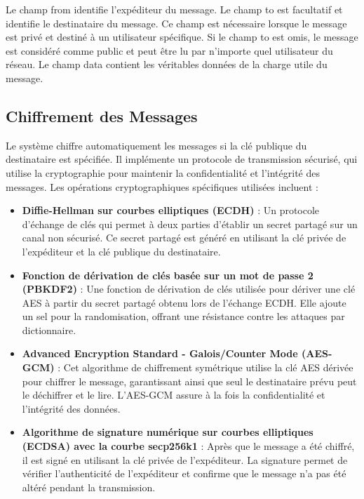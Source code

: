 Le champ from identifie l'expéditeur du message.
Le champ to est facultatif et identifie le destinataire du message. Ce champ est nécessaire lorsque le message est privé et destiné à un utilisateur spécifique. Si le champ to est omis, le message est considéré comme public et peut être lu par n'importe quel utilisateur du réseau.
Le champ data contient les véritables données de la charge utile du message.

\subsection{Chiffrement des Messages}

Le système chiffre automatiquement les messages si la clé publique du destinataire est spécifiée. Il implémente un protocole de transmission sécurisé, qui utilise la cryptographie pour maintenir la confidentialité et l'intégrité des messages. Les opérations cryptographiques spécifiques utilisées incluent :

\begin{itemize}
\item \textbf{Diffie-Hellman sur courbes elliptiques (ECDH)} : Un protocole d'échange de clés qui permet à deux parties d'établir un secret partagé sur un canal non sécurisé. Ce secret partagé est généré en utilisant la clé privée de l'expéditeur et la clé publique du destinataire.
\item \textbf{Fonction de dérivation de clés basée sur un mot de passe 2 (PBKDF2)} : Une fonction de dérivation de clés utilisée pour dériver une clé AES à partir du secret partagé obtenu lors de l'échange ECDH. Elle ajoute un sel pour la randomisation, offrant une résistance contre les attaques par dictionnaire.
\item \textbf{Advanced Encryption Standard - Galois/Counter Mode (AES-GCM)} : Cet algorithme de chiffrement symétrique utilise la clé AES dérivée pour chiffrer le message, garantissant ainsi que seul le destinataire prévu peut le déchiffrer et le lire. L'AES-GCM assure à la fois la confidentialité et l'intégrité des données.
\item \textbf{Algorithme de signature numérique sur courbes elliptiques (ECDSA) avec la courbe secp256k1} : Après que le message a été chiffré, il est signé en utilisant la clé privée de l'expéditeur. La signature permet de vérifier l'authenticité de l'expéditeur et confirme que le message n'a pas été altéré pendant la transmission.
\end{itemize}

